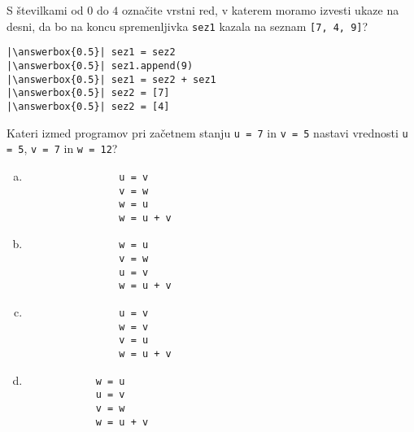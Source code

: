 \documentclass[arhiv, 10pt]{../izpit}
\newcommand{\inlinepy}[1]{\texttt{#1}}
\newcommand{\answerbox}[1]{\framebox{\vphantom{\large M}\hspace{#1cm}}}
\begin{document}
        \naloga*
        \begin{multicols}{2}
        \noindent 
        S številkami od $0$ do $4$ označite vrstni red, v katerem moramo izvesti ukaze na desni, da bo na koncu spremenljivka \inlinepy{sez1} kazala na seznam \inlinepy{[7, 4, 9]}?
    
        \columnbreak
        \noindent
        \begin{verbatim}
|\answerbox{0.5}| sez1 = sez2
|\answerbox{0.5}| sez1.append(9)
|\answerbox{0.5}| sez1 = sez2 + sez1
|\answerbox{0.5}| sez2 = [7]
|\answerbox{0.5}| sez2 = [4]

        \end{verbatim}
        \end{multicols}
    
            
        \naloga*
        
        Kateri izmed programov pri začetnem stanju
            \inlinepy{u = 7} in
            \inlinepy{v = 5}
        nastavi vrednosti
            \inlinepy{u = 5},
            \inlinepy{v = 7} in
            \inlinepy{w = 12}?
    
        \begin{multicols}{4}
        \begin{enumerate}[(a)]
\item 
                \begin{verbatim}
                u = v
                v = w
                w = u
                w = u + v
                \end{verbatim}
            
\item 
                \begin{verbatim}
                w = u
                v = w
                u = v
                w = u + v
                \end{verbatim}
            
\item 
                \begin{verbatim}
                u = v
                w = v
                v = u
                w = u + v
                \end{verbatim}
            
\item 
            \begin{verbatim}
            w = u
            u = v
            v = w
            w = u + v
            \end{verbatim}
        
\end{enumerate}

        \end{multicols}
    
\end{document}
